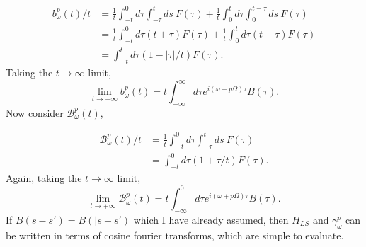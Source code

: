 \documentclass[10pt]{article}
\numberwithin{equation}{section}
\begin{document}
\begin{align}
b_{\omega}^{p}(t)/t &= \frac{1}{t}\int_{-t}^0 d\tau \int_{-\tau}^t ds\: F(\tau) + \frac{1}{t}\int_{0}^t d\tau \int_{0}^{t-\tau} ds\: F(\tau) \\
		             &= \frac{1}{t}\int_{-t}^0 d\tau (t+\tau) F(\tau) + \frac{1}{t}\int_{0}^t d\tau (t-\tau) F(\tau) \\
                             &= \int_{-t}^t d\tau (1-|\tau|/t) F(\tau).
\end{align}
Taking the $t \to \infty$ limit, 
\begin{equation} \label{eq:14}
 \lim_{t \to +\infty} b_{\omega}^{p}(t) = t\int_{-\infty}^\infty d\tau e^{i(\omega + p\Omega)\tau}B(\tau).
\end{equation}
Now consider $\mathcal{B}_{\omega}^{p}(t)$,

\begin{align} 
\mathcal{B}_{\omega}^{p}(t)/t &= \frac{1}{t}\int_{-t}^0 d\tau \int_{-\tau}^t ds\: F(\tau) \\
		             &= \int_{-t}^0 d\tau (1+\tau/t) F(\tau).                           
\end{align}
Again, taking the $t \to \infty$ limit,
\begin{equation} \label{eq:15}
\lim_{t \to +\infty}\mathcal{B}_{\omega}^{p}(t) =  t\int_{-\infty}^0 d\tau e^{i(\omega + p\Omega)\tau}B(\tau).
\end{equation}
If $B(s-s')=B(|s-s')$ which I have already assumed, then $H_{LS}$ and $\gamma_{\omega}^{p}$ can be written in terms of cosine fourier transforms, which are simple to evaluate. 
\end{document}
